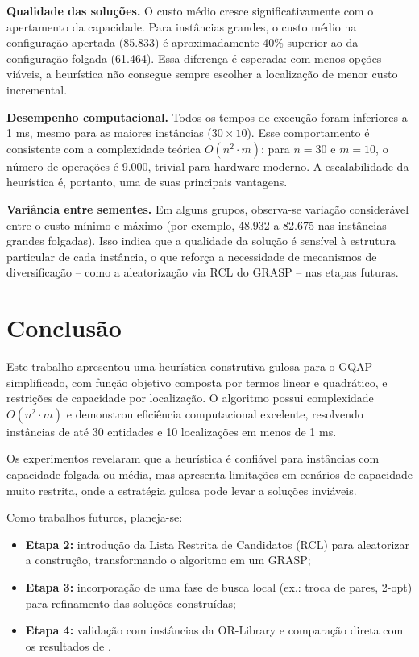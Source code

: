\documentclass[12pt]{article}
\begin{document}
\textbf{Qualidade das soluções.} O custo médio cresce significativamente com o
apertamento da capacidade. Para instâncias grandes, o custo médio na configuração
apertada (85.833) é aproximadamente 40\% superior ao da configuração folgada
(61.464). Essa diferença é esperada: com menos opções viáveis, a heurística
não consegue sempre escolher a localização de menor custo incremental.

\textbf{Desempenho computacional.} Todos os tempos de execução foram inferiores
a 1 ms, mesmo para as maiores instâncias ($30 \times 10$). Esse comportamento é
consistente com a complexidade teórica $O(n^2 \cdot m)$: para $n=30$ e $m=10$,
o número de operações é 9.000, trivial para hardware moderno. A escalabilidade
da heurística é, portanto, uma de suas principais vantagens.

\textbf{Variância entre sementes.} Em alguns grupos, observa-se variação
considerável entre o custo mínimo e máximo (por exemplo, 48.932 a 82.675 nas
instâncias grandes folgadas). Isso indica que a qualidade da solução é sensível
à estrutura particular de cada instância, o que reforça a necessidade de
mecanismos de diversificação -- como a aleatorização via RCL do GRASP -- nas
etapas futuras.


\section{Conclusão}

Este trabalho apresentou uma heurística construtiva gulosa para o GQAP
simplificado, com função objetivo composta por termos linear e quadrático, e
restrições de capacidade por localização. O algoritmo possui complexidade
$O(n^2 \cdot m)$ e demonstrou eficiência computacional excelente, resolvendo
instâncias de até 30 entidades e 10 localizações em menos de 1 ms.

Os experimentos revelaram que a heurística é confiável para instâncias com
capacidade folgada ou média, mas apresenta limitações em cenários de capacidade
muito restrita, onde a estratégia gulosa pode levar a soluções inviáveis.

Como trabalhos futuros, planeja-se:
\begin{itemize}
  \item \textbf{Etapa 2:} introdução da Lista Restrita de Candidatos (RCL) para
        aleatorizar a construção, transformando o algoritmo em um GRASP;
  \item \textbf{Etapa 3:} incorporação de uma fase de busca local
        (ex.: troca de pares, 2-opt) para refinamento das soluções construídas;
  \item \textbf{Etapa 4:} validação com instâncias da OR-Library e comparação
        direta com os resultados de \cite{cordeau:2006}.
\end{itemize}



\end{document}
